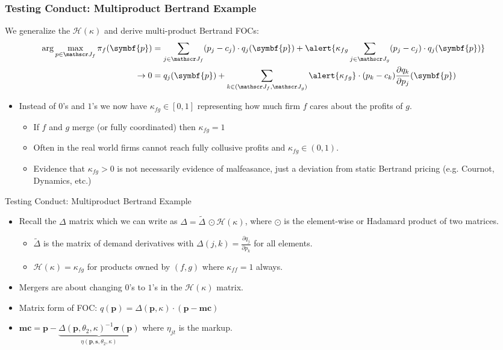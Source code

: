 \documentclass[aspectratio=169,10pt]{beamer}
\begin{document}
\begin{frame}
\frametitle{Testing Conduct: Multiproduct Bertrand Example}
\small
We generalize the $\mathcal{H}(\kappa)$ and derive multi-product Bertrand FOCs:
\begin{align*}
\arg \max_{p \in \calJ_f} \pi_f (\symbf{p}) &= \sum_{j \in \calJ_f} (p_j - c_j) \cdot q_j(\symbf{p}) +  \alert{\kappa_{fg} \sum_{j \in \calJ_g} (p_j - c_j) \cdot q_j(\symbf{p})} \\
\rightarrow 0&= q_j(\symbf{p}) + \sum_{k \in (\calJ_f,\calJ_g)} \alert{\kappa_{fg}}\cdot (p_k - c_k) \frac{\partial q_{k}}{\partial p_j}(\symbf{p}) 
\end{align*}
\begin{itemize}
\item Instead of $0$'s and $1$'s we now have $\kappa_{fg} \in [0,1]$ representing how much firm $f$ cares about the profits of $g$.
\begin{itemize}
\item If $f$ and $g$ merge (or fully coordinated) then $\kappa_{fg} =1$
\item Often in the real world firms cannot reach fully collusive profits and $\kappa_{fg} \in (0,1)$.
\item Evidence that $\kappa_{fg} > 0$ is not necessarily evidence of malfeasance, just a deviation from \alert{static Bertrand pricing} (e.g. Cournot, Dynamics, etc.)
\end{itemize}
\end{itemize}
\end{frame}


\begin{frame}{Testing Conduct: Multiproduct Bertrand Example}
\begin{itemize}
\item Recall the $\Delta$ matrix which we can write as $\Delta=\tilde{\Delta}\, \odot \mathcal{H}(\kappa)$, where $\odot$ is the element-wise or Hadamard product of two matrices. 
\begin{itemize}
\item $\tilde{\Delta}$ is the matrix of demand derivatives with $\Delta{(j,k)} = \frac{\partial q_j}{\partial p_k}$ for all elements.
\item $\mathcal{H}(\kappa)=\kappa_{fg}$ for products owned by $(f,g)$ where $\kappa_{ff}=1$ always.
\end{itemize}
\item Mergers are about changing $0$'s to $1$'s in the $\mathcal{H}(\kappa)$ matrix.
\item Matrix form of FOC: $q(\symbf{p}) = \Delta(\symbf{p},\kappa)\cdot(\symbf{p}-\symbf{mc})$
\item $\symbf{mc} =  \symbf{p} - \underbrace{\Delta(\symbf{p}, \theta_2, \kappa)^{-1} \symbf{\sigma}(\symbf{p})}_{\eta(\symbf{p},\symbf{s},\theta_2,\kappa)}$
where $\eta_{jt}$ is the markup.
\end{itemize}
\end{frame}
\end{document}
